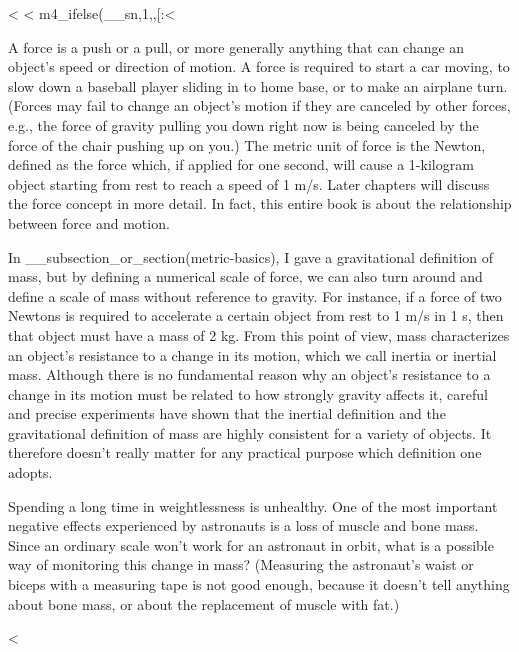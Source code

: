 <%
<%
m4_ifelse(__sn,1,,[:<%

A force is a push or a pull, or more generally anything that
can change an object's speed or direction of motion. A force
is required to start a car moving, to slow down a baseball
player sliding in to home base, or to make an airplane turn.
(Forces may fail to change an object's motion if they are
canceled by other forces, e.g., the force of gravity pulling
you down right now is being canceled by the force of the
chair pushing up on you.) The metric unit of force is the
Newton, defined as the force which, if applied for one
second, will cause a 1-kilogram object starting from rest to
reach a speed of 1 m/s. Later chapters will discuss the
force concept in more detail. In fact, this entire book is
about the relationship between force and motion.


In __subsection_or_section(metric-basics), I gave a gravitational definition
of mass, but by defining a numerical scale of force, we can
also turn around and define a scale of mass without
reference to gravity. For instance, if a force of two
Newtons is required to accelerate a certain object from rest
to 1 m/s in 1 s, then that object must have a mass of 2
kg. From this point of view, mass characterizes an object's
resistance to a change in its motion, which we call inertia
or inertial mass. Although there is no fundamental reason
why an object's resistance to a change in its motion must be
related to how strongly gravity affects it, careful and
precise experiments have shown that the inertial definition
and the gravitational definition of mass are highly
consistent for a variety of objects. It therefore doesn't
really matter for any practical purpose which definition one adopts.

\startdq

\begin{dq}
Spending a long time in weightlessness is unhealthy. One of
the most important negative effects experienced by
astronauts is a loss of muscle and bone mass. Since an
ordinary scale won't work for an astronaut in orbit, what is
a possible way of monitoring this change in mass? (Measuring
the astronaut's waist or biceps with a measuring tape is not
good enough, because it doesn't tell anything about bone
mass, or about the replacement of muscle with fat.)
\end{dq}

<%

